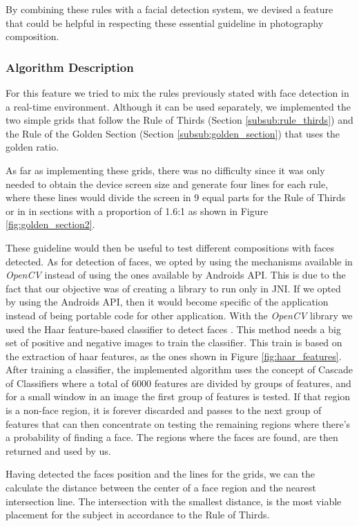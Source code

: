 By combining these rules with a facial detection system, we devised a feature that could be helpful in respecting these essential guideline in photography composition.

\subsubsection{Algorithm Description}

For this feature we tried to mix the rules previously stated with face detection in a real-time environment. Although it can be used separately, we implemented the two simple grids that follow the Rule of Thirds (Section \ref{subsub:rule_thirds}) and the Rule of the Golden Section (Section \ref{subsub:golden_section}) that uses the golden ratio.

As far as implementing these grids, there was no difficulty since it was only needed to obtain the device screen size and generate four lines for each rule, where these lines would divide the screen in 9 equal parts for the Rule of Thirds or in in sections with a proportion of 1.6:1 as shown in Figure \ref{fig:golden_section2}.

These guideline would then be useful to test different compositions with faces detected. As for detection of faces, we opted by using the mechanisms available in \emph{OpenCV} instead of using the ones available by Androids API. This is due to the fact that our objective was of creating a library to run only in JNI. If we opted by using the Androids API, then it would become specific of the application instead of being portable code for other application.
With the \emph{OpenCV} library we used the Haar feature-based classifier to detect faces \cite{viola2001rapid}. This method needs a big set of positive and negative images to train the classifier. This train is based on the extraction of haar features, as the ones shown in Figure \ref{fig:haar_features}. After training a classifier, the implemented algorithm uses the concept of Cascade of Classifiers where a total of 6000 features are divided by groups of features, and for a small window in an image the first group of features is tested. If that region is a non-face region, it is forever discarded and passes to the next group of features that can then concentrate on testing the remaining regions where there's a probability of finding a face. The regions where the faces are found, are then returned and used by us.

Having detected the faces position and the lines for the grids, we can the calculate the distance between the center of a face region and the nearest intersection line. The intersection with the smallest distance, is the most viable placement for the subject in accordance to the Rule of Thirds.

